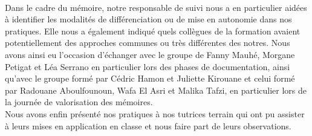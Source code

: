 \paragraph*{}
Dans le cadre du mémoire, notre responsable de suivi nous a en particulier aidées à identifier les modalités de différenciation ou de mise en autonomie dans nos pratiques. Elle nous a également indiqué quels collègues de la formation avaient potentiellement des approches communes ou très différentes des notres. Nous avons ainsi eu l'occasion d'échanger avec le groupe de Fanny Mauhé, Morgane Petigat et Léa Serrano\cite{memoire_fanny} en particulier lors des phases de documentation, ainsi qu'avec le groupe formé par Cédric Hamon et Juliette Kirouane\cite{memoire_eval_differenciee} et celui formé par Radouane Aboulfounoun, Wafa El Asri et Malika Tafzi\cite{memoire_Malika}, en particulier lors de la journée de valorisation des mémoires.\\
Nous avons enfin présenté nos pratiques à nos tutrices terrain qui ont pu assister à leurs mises en application en classe et nous faire part de leurs observations.
